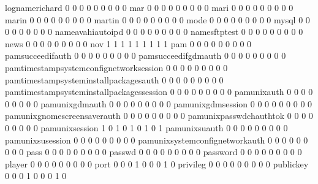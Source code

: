 \documentclass[compress,8pt]{beamer}
\begin{document}
\begin{frame}
\begin{Schunk}
  lognamerichard                             0   0   0   0   0   0   0   0   0
  mar                                        0   0   0   0   0   0   0   0   0
  mari                                       0   0   0   0   0   0   0   0   0
  marin                                      0   0   0   0   0   0   0   0   0
  martin                                     0   0   0   0   0   0   0   0   0
  mode                                       0   0   0   0   0   0   0   0   0
  mysql                                      0   0   0   0   0   0   0   0   0
  nameavahiautoipd                           0   0   0   0   0   0   0   0   0
  namesftptest                               0   0   0   0   0   0   0   0   0
  news                                       0   0   0   0   0   0   0   0   0
  nov                                        1   1   1   1   1   1   1   1   1
  pam                                        0   0   0   0   0   0   0   0   0
  pamsucceedifauth                           0   0   0   0   0   0   0   0   0
  pamsucceedifgdmauth                        0   0   0   0   0   0   0   0   0
  pamtimestampsystemconfignetworksession     0   0   0   0   0   0   0   0   0
  pamtimestampsysteminstallpackagesauth      0   0   0   0   0   0   0   0   0
  pamtimestampsysteminstallpackagessession   0   0   0   0   0   0   0   0   0
  pamunixauth                                0   0   0   0   0   0   0   0   0
  pamunixgdmauth                             0   0   0   0   0   0   0   0   0
  pamunixgdmsession                          0   0   0   0   0   0   0   0   0
  pamunixgnomescreensaverauth                0   0   0   0   0   0   0   0   0
  pamunixpasswdchauthtok                     0   0   0   0   0   0   0   0   0
  pamunixsession                             1   0   1   0   1   0   1   0   1
  pamunixsuauth                              0   0   0   0   0   0   0   0   0
  pamunixsusession                           0   0   0   0   0   0   0   0   0
  pamunixsystemconfignetworkauth             0   0   0   0   0   0   0   0   0
  pass                                       0   0   0   0   0   0   0   0   0
  passwd                                     0   0   0   0   0   0   0   0   0
  password                                   0   0   0   0   0   0   0   0   0
  player                                     0   0   0   0   0   0   0   0   0
  port                                       0   0   0   1   0   0   0   1   0
  privileg                                   0   0   0   0   0   0   0   0   0
  publickey                                  0   0   0   1   0   0   0   1   0

\end{Schunk}
\end{frame}
\end{document}
